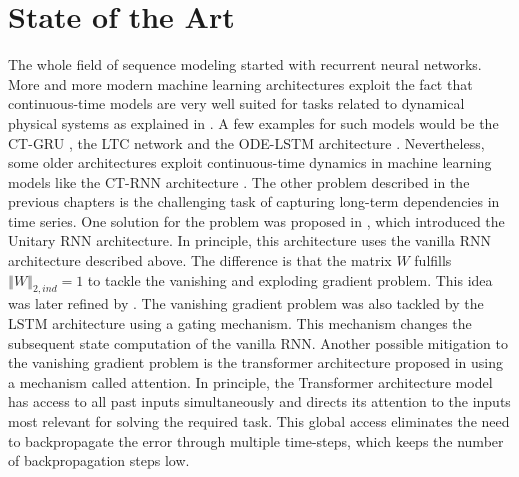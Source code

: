 \documentclass[draft,final]{vutinfth} %
\begin{document}
    \section{State of the Art}
    The whole field of sequence modeling started with recurrent neural networks.
    More and more modern machine learning architectures exploit the fact that continuous-time models are very well suited for tasks related to dynamical physical systems as explained in .
    A few examples for such models would be the CT-GRU \cite{CTGRU}, the LTC network \cite{LTCNetworks} and the ODE-LSTM architecture \cite{ODELSTM}.
    Nevertheless, some older architectures exploit continuous-time dynamics in machine learning models like the CT-RNN architecture \cite{CTRNN}.
    The other problem described in the previous chapters is the challenging task of capturing long-term dependencies in time series.
    One solution for the problem was proposed in \cite{UnitaryRNNs}, which introduced the Unitary RNN architecture.
    In principle, this architecture uses the vanilla RNN architecture described above. The difference is that the matrix $W$ fulfills $\left\Vert W \right\Vert_{2,ind} = 1$ to tackle the vanishing and exploding gradient problem.
    This idea was later refined by \cite{EfficientUnitaryRNNs}.
    The vanishing gradient problem was also tackled by the LSTM architecture \cite{LSTM} using a gating mechanism.
    This mechanism changes the subsequent state computation of the vanilla RNN.
    Another possible mitigation to the vanishing gradient problem is the transformer architecture proposed in \cite{Transformer} using a mechanism called attention.
    In principle, the Transformer architecture model has access to all past inputs simultaneously and directs its attention to the inputs most relevant for solving the required task.
    This global access eliminates the need to backpropagate the error through multiple time-steps, which keeps the number of backpropagation steps low.

\end{document}
